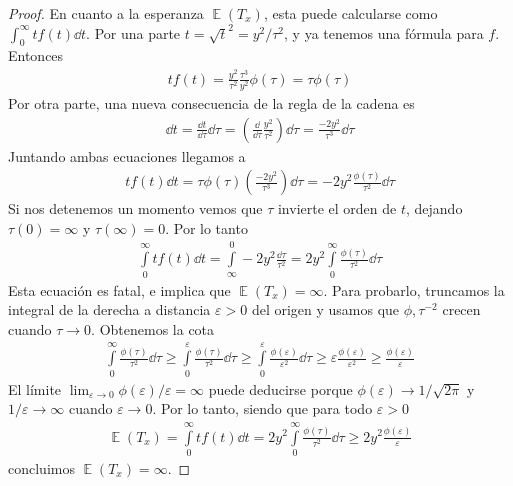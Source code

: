 \documentclass{article}
\DeclareMathOperator{\Expectation}{\mathbb{E}}
\theoremstyle{definition}
\begin{document}
\begin{proof}
En cuanto a la esperanza \(\Expectation(T_x)\), esta puede calcularse como \(\int_0^{\infty} t f(t) \dd t\).
Por una parte \(t = \sqrt{t}^2 = y^2 / \tau^2\), y ya tenemos una fórmula para \(f\).
Entonces
\begin{align}
	t f(t)
	=
	\frac{y^2}{\tau^2} \frac{\tau^3}{y^2} \phi(\tau)
	=
	\tau \phi(\tau)	
\end{align}
Por otra parte, una nueva consecuencia de la regla de la cadena es
\begin{align}
	\dd t
	=
	\frac{\dd t}{\dd \tau} \dd \tau
	=
	\left( \frac{\dd}{\dd \tau} \frac{y^2}{\tau^2} \right) \dd \tau
	=
	\frac{- 2 y^2}{\tau^3} \dd \tau
\end{align}
Juntando ambas ecuaciones llegamos a
\begin{align}
	t f(t) \dd t
	=
	\tau \phi(\tau) \left( \frac{- 2 y^2}{\tau^3} \right) \dd \tau
	=
	- 2 y^2 \frac{\phi(\tau)}{\tau^2} \dd \tau
\end{align}
Si nos detenemos un momento vemos que \(\tau\) invierte el orden de \(t\), dejando \(\tau(0) = \infty\) y \(\tau(\infty) = 0\).
Por lo tanto
\begin{align}
	\int\limits_0^{\infty} t f(t) \dd t
	=
	\int\limits_{\infty}^0 - 2 y^2 \frac{\dd \tau}{\tau^2}
	=
	2 y^2 \int\limits_0^{\infty} \frac{\phi(\tau)}{\tau^2} \dd \tau
\end{align}
Esta ecuación es fatal, e implica que \(\Expectation(T_x) = \infty\).
Para probarlo, truncamos la integral de la derecha a distancia \(\varepsilon > 0\) del origen y usamos que \(\phi, \tau^{- 2}\) crecen cuando \(\tau \rightarrow 0\).
Obtenemos la cota
\begin{align}
	\int\limits_0^{\infty} \frac{\phi(\tau)}{\tau^2} \dd \tau
	\geq
	\int\limits_0^{\varepsilon} \frac{\phi(\tau)}{\tau^2} \dd \tau
	\geq
	\int\limits_0^{\varepsilon} \frac{\phi(\varepsilon)}{\varepsilon^2} \dd \tau
	\geq
	\varepsilon \frac{\phi(\varepsilon)}{\varepsilon^2}
	\geq
	\frac{\phi(\varepsilon)}{\varepsilon}
\end{align}
El límite \( \lim_{\varepsilon \rightarrow 0}\phi(\varepsilon) / \varepsilon = \infty\) puede deducirse porque \(\phi(\varepsilon) \rightarrow 1 / \sqrt{2 \pi}\) y \(1 / \varepsilon \rightarrow \infty\) cuando \(\varepsilon \rightarrow 0\).
Por lo tanto, siendo que para todo \(\varepsilon > 0\)
\begin{align}
	\Expectation(T_x)
	= 
	\int\limits_0^{\infty} t f(t) \dd t
	=
	2 y^2 \int\limits_0^{\infty} \frac{\phi(\tau)}{\tau^2} \dd \tau
	\geq
	2 y^2 \frac{\phi(\varepsilon)}{\varepsilon}
\end{align}
concluimos \(\Expectation(T_x) = \infty\).
\end{proof}
\endgroup
\end{document}
